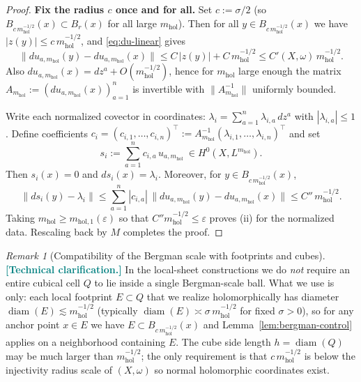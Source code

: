 \documentclass[11pt]{article}
\newcommand{\REVMZ}[1]{\textcolor{teal}{#1}}  %
\numberwithin{equation}{section}  %
\theoremstyle{plain}
\theoremstyle{definition}
\theoremstyle{remark}
\newtheorem{remark}[theorem]{Remark}
\newcommand{\mhol}{m_{\mathrm{hol}}} %
\DeclareMathOperator{\diam}{diam}
\begin{document}
\begin{proof}
{\noindent\textbf{Fix the radius $c$ once and for all.}
Set $c:=\sigma/2$ (so $B_{c\,\mhol^{-1/2}}(x)\subset B_r(x)$ for all large $\mhol$).
Then for all $y\in B_{c\,\mhol^{-1/2}}(x)$ we have $|z(y)|\le c\,\mhol^{-1/2}$, and \eqref{eq:du-linear} gives
\[
\|du_{a,\mhol}(y)-du_{a,\mhol}(x)\|
\le C\,|z(y)| + C\,\mhol^{-1/2}
\le C'(X,\omega)\,\mhol^{-1/2}.
\]
Also $du_{a,\mhol}(x)=dz^a+O(\mhol^{-1/2})$, hence for $\mhol$ large enough the matrix
$A_{\mhol}:=(du_{a,\mhol}(x))_{a=1}^n$ is invertible with $\|A_{\mhol}^{-1}\|$ uniformly bounded.

Write each normalized covector in coordinates: $\lambda_i=\sum_{a=1}^n \lambda_{i,a}\,dz^a$ with $|\lambda_{i,a}|\le 1$.
Define coefficients $c_i=(c_{i,1},\dots,c_{i,n})^\top:=A_{\mhol}^{-1}(\lambda_{i,1},\dots,\lambda_{i,n})^\top$ and set
\[
s_i:=\sum_{a=1}^n c_{i,a}\,u_{a,\mhol}\ \in H^0(X,L^{\mhol}).
\]
Then $s_i(x)=0$ and $ds_i(x)=\lambda_i$. Moreover, for $y\in B_{c\,\mhol^{-1/2}}(x)$,
\[
\|ds_i(y)-\lambda_i\|
\le \sum_{a=1}^n |c_{i,a}|\,\|du_{a,\mhol}(y)-du_{a,\mhol}(x)\|
\le C''\,\mhol^{-1/2}.
\]
Taking $\mhol\ge m_{\mathrm{hol},1}(\varepsilon)$ so that $C''\mhol^{-1/2}\le \varepsilon$ proves (ii) for the normalized data.
Rescaling back by $M$ completes the proof.
}

\end{proof}


\begin{remark}[Compatibility of the Bergman scale with footprints and cubes]
\REVMZ{\textbf{[Technical clarification.]}}
In the local-sheet constructions we do \emph{not} require an entire cubical cell $Q$
to lie inside a single Bergman-scale ball.
What we use is only: each local footprint $E\subset Q$ that we realize holomorphically
has diameter $\diam(E)\lesssim \mhol^{-1/2}$ (typically $\diam(E)\asymp \sigma\,\mhol^{-1/2}$ for fixed $\sigma>0$),
so for any anchor point $x\in E$ we have $E\subset B_{c\,\mhol^{-1/2}}(x)$ and Lemma~\ref{lem:bergman-control}
applies on a neighborhood containing $E$.
The cube side length $h=\diam(Q)$ may be much larger than $\mhol^{-1/2}$; the only requirement is that
$c\,\mhol^{-1/2}$ is below the injectivity radius scale of $(X,\omega)$ so normal holomorphic coordinates exist.

\end{remark}
\end{document}
